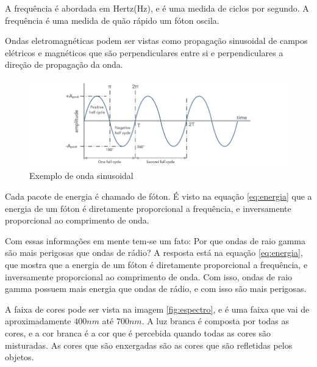 \documentclass[12pt]{article}
\begin{document}
    A frequência é abordada em Hertz(Hz), e é uma medida de ciclos por segundo. A frequência é uma
    medida de quão rápido um fóton oscila.

    Ondas eletromagnéticas podem ser vistas como propagação sinusoidal de campos elétricos e magnéticos
que são perpendiculares entre si e perpendiculares a direção de propagação da onda.

    \begin{figure}[h]
    \begin{adjustwidth}{-5cm}{}
        \centering
        \includegraphics[]{images/15.png}
        \caption{Exemplo de onda sinusoidal}
        \label{fig:onda}
    \end{adjustwidth}
\end{figure}

    Cada pacote de energia é chamado de fóton. É visto na equação \ref{eq:energia} que a energia de um
    fóton é diretamente proporcional a frequência, e inversamente proporcional ao comprimento de onda.

    Com essas informações em mente tem-se um fato: Por que ondas de raio gamma são mais perigosas que
    ondas de rádio? A resposta está na equação \ref{eq:energia}, que mostra que a energia de um fóton
    é diretamente proporcional a frequência, e inversamente proporcional ao comprimento de onda. Com
    isso, ondas de raio gamma possuem mais energia que ondas de rádio, e com isso são mais perigosas.

    A faixa de cores pode ser vista na imagem \ref{fig:espectro}, e é uma faixa que vai de aproximadamente
    $400nm$ até $700nm$. A luz branca é composta por todas as cores, e a cor branca é a cor que é
    percebida quando todas as cores são misturadas. As cores que são enxergadas são as cores que são
    refletidas pelos objetos.
\end{document}
